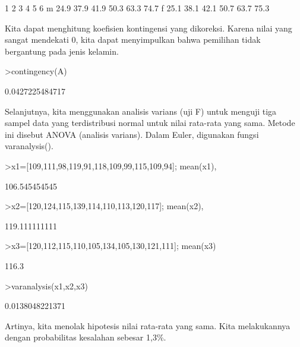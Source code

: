 \documentclass[a4paper,10pt]{article}
\begin{document}
\begin{eulernotebook}
\begin{eulerprompt}
\end{eulerprompt}
\begin{euleroutput}
             1     2     3     4     5     6
       m  24.9  37.9  41.9  50.3  63.3  74.7
       f  25.1  38.1  42.1  50.7  63.7  75.3
\end{euleroutput}
\begin{eulercomment}
Kita dapat menghitung koefisien kontingensi yang dikoreksi. Karena
nilai yang sangat mendekati 0, kita dapat menyimpulkan bahwa pemilihan
tidak bergantung pada jenis kelamin.
\end{eulercomment}
\begin{eulerprompt}
>contingency(A)
\end{eulerprompt}
\begin{euleroutput}
  0.0427225484717
\end{euleroutput}
\begin{eulercomment}
\begin{eulercomment}
\begin{eulercomment}
Selanjutnya, kita menggunakan analisis varians (uji F) untuk menguji
tiga sampel data yang terdistribusi normal untuk nilai rata-rata yang
sama. Metode ini disebut ANOVA (analisis varians). Dalam Euler,
digunakan fungsi varanalysis().
\end{eulercomment}
\begin{eulerprompt}
>x1=[109,111,98,119,91,118,109,99,115,109,94]; mean(x1),
\end{eulerprompt}
\begin{euleroutput}
  106.545454545
\end{euleroutput}
\begin{eulerprompt}
>x2=[120,124,115,139,114,110,113,120,117]; mean(x2),
\end{eulerprompt}
\begin{euleroutput}
  119.111111111
\end{euleroutput}
\begin{eulerprompt}
>x3=[120,112,115,110,105,134,105,130,121,111]; mean(x3)
\end{eulerprompt}
\begin{euleroutput}
  116.3
\end{euleroutput}
\begin{eulerprompt}
>varanalysis(x1,x2,x3)
\end{eulerprompt}
\begin{euleroutput}
  0.0138048221371
\end{euleroutput}
\begin{eulercomment}
Artinya, kita menolak hipotesis nilai rata-rata yang sama. Kita
melakukannya dengan probabilitas kesalahan sebesar 1,3\%.


\end{eulercomment}
\end{eulercomment}
\end{eulercomment}
\end{eulernotebook}
\end{document}

